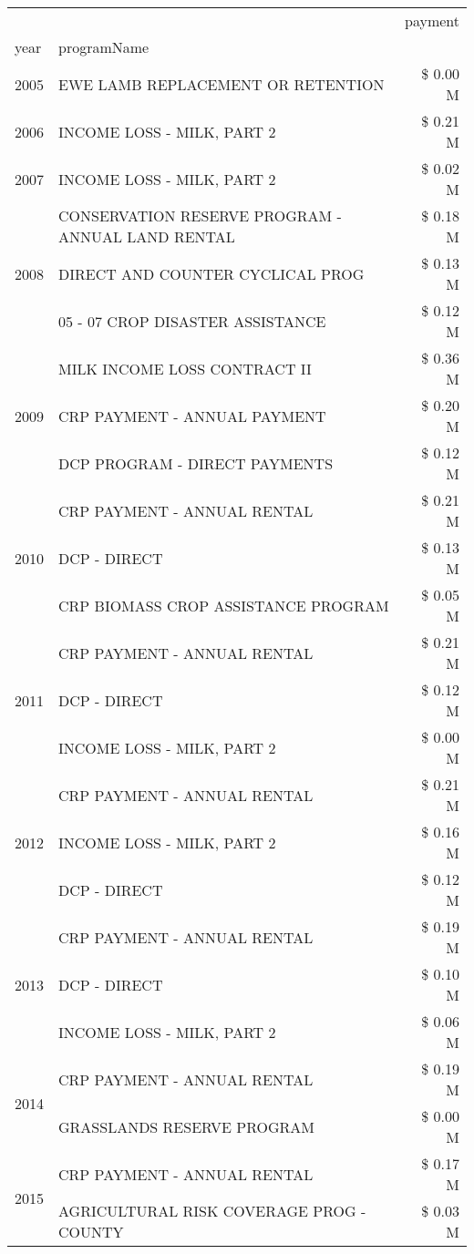 \begin{tabular}{llr}
\toprule
 &  & payment \\
year & programName &  \\
\midrule
2005 & EWE LAMB REPLACEMENT OR RETENTION & \$ 0.00 M \\
\cline{1-3}
2006 & INCOME LOSS - MILK, PART 2 & \$ 0.21 M \\
\cline{1-3}
2007 & INCOME LOSS - MILK, PART 2 & \$ 0.02 M \\
\cline{1-3}
\multirow[t]{3}{*}{2008} & CONSERVATION RESERVE PROGRAM - ANNUAL LAND RENTAL & \$ 0.18 M \\
 & DIRECT AND COUNTER CYCLICAL PROG & \$ 0.13 M \\
 & 05 - 07 CROP DISASTER ASSISTANCE & \$ 0.12 M \\
\cline{1-3}
\multirow[t]{3}{*}{2009} & MILK INCOME LOSS CONTRACT II & \$ 0.36 M \\
 & CRP PAYMENT - ANNUAL PAYMENT & \$ 0.20 M \\
 & DCP PROGRAM - DIRECT PAYMENTS & \$ 0.12 M \\
\cline{1-3}
\multirow[t]{3}{*}{2010} & CRP PAYMENT - ANNUAL RENTAL & \$ 0.21 M \\
 & DCP - DIRECT & \$ 0.13 M \\
 & CRP BIOMASS CROP ASSISTANCE PROGRAM & \$ 0.05 M \\
\cline{1-3}
\multirow[t]{3}{*}{2011} & CRP PAYMENT - ANNUAL RENTAL & \$ 0.21 M \\
 & DCP - DIRECT & \$ 0.12 M \\
 & INCOME LOSS - MILK, PART 2 & \$ 0.00 M \\
\cline{1-3}
\multirow[t]{3}{*}{2012} & CRP PAYMENT - ANNUAL RENTAL & \$ 0.21 M \\
 & INCOME LOSS - MILK, PART 2 & \$ 0.16 M \\
 & DCP - DIRECT & \$ 0.12 M \\
\cline{1-3}
\multirow[t]{3}{*}{2013} & CRP PAYMENT - ANNUAL RENTAL & \$ 0.19 M \\
 & DCP - DIRECT & \$ 0.10 M \\
 & INCOME LOSS - MILK, PART 2 & \$ 0.06 M \\
\cline{1-3}
\multirow[t]{2}{*}{2014} & CRP PAYMENT - ANNUAL RENTAL & \$ 0.19 M \\
 & GRASSLANDS RESERVE PROGRAM & \$ 0.00 M \\
\cline{1-3}
\multirow[t]{2}{*}{2015} & CRP PAYMENT - ANNUAL RENTAL & \$ 0.17 M \\
 & AGRICULTURAL RISK COVERAGE PROG - COUNTY & \$ 0.03 M \\

\end{tabular}
